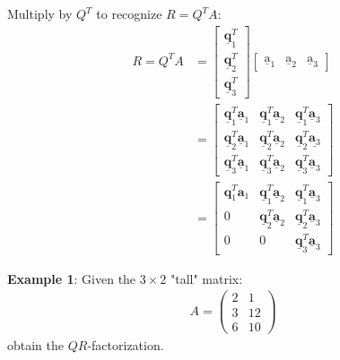 \documentclass[10pt,a4paper]{article}
\begin{document}
Multiply by $Q^T$ to recognize $R = Q^T A$:
\begin{align*}
    R=Q^{T} A &= \begin{bmatrix}
        \underline{\mathbf{q}}_{1}^{T} \\
        \underline{\mathbf{q}}_{2}^{T} \\
        \underline{\mathbf{q}}_{3}^{T}
    \end{bmatrix}
    \begin{bmatrix}
        \underline{\mathrm{a}}_{1}&\underline{\mathrm{a}}_{2}&\underline{\mathrm{a}}_{3}
    \end{bmatrix} \\ &= 
    \begin{bmatrix}
        \underline{\mathbf{q}}_{1}^{T} \underline{\mathbf{a}}_{1} & \underline{\mathbf{q}}_{1}^{T} \underline{\mathbf{a}}_{2} & \underline{\mathbf{q}}_{1}^{T} \underline{\mathbf{a}}_{3} \\
        \underline{\mathbf{q}}_{2}^{T} \underline{\mathbf{a}}_{1} & \underline{\mathbf{q}}_{2}^{T} \underline{\mathbf{a}}_{2} & \underline{\mathbf{q}}_{2}^{T} \underline{\mathbf{a}_{3}} \\
        \underline{\mathbf{q}}_{3}^{T} \underline{\mathbf{a}}_{1} & \underline{\mathbf{q}}_{3}^{T} \underline{\mathbf{a}}_{2} & \underline{\mathbf{q}}_{3}^{T} \underline{\mathbf{a}}_{3}
    \end{bmatrix} \\ &= 
    \begin{bmatrix}
        \mathbf{q}_{1}^{T} \mathbf{a}_{1} & \underline{\mathbf{q}}_{1}^{T} \underline{\mathbf{a}}_{2} & \underline{\mathbf{q}}_{1}^{T} \underline{\mathbf{a}}_{3} \\
        0 & \underline{\mathbf{q}}_{2}^{T} \underline{\mathbf{a}}_{2} & \underline{\mathbf{q}}_{2}^{T} \underline{\mathbf{a}}_{3} \\
        0 & 0 & \underline{\mathbf{q}}_{3}^{T} \underline{\mathbf{a}}_{3}
    \end{bmatrix} 
\end{align*}

\pagebreak

\textbf{Example 1}: Given the $3 \times 2$ "tall" matrix:
\begin{align*}
    A=\left(\begin{array}{cc}
        2 & 1 \\
        3 & 12 \\
        6 & 10
    \end{array}\right)
\end{align*}
obtain the $QR$-factorization.
\end{document}
